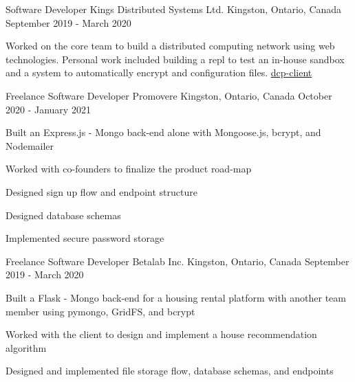 

\begin{cventries}

  \cventry
    {Software Developer} %
    {Kings Distributed Systems Ltd.} %
    {Kingston, Ontario, Canada} %
    {September 2019 - March 2020} %
    {
      \begin{cvitems} %
        \item {Worked on the core team to build a distributed computing network using web technologies. Personal work included building a repl to test an in-house sandbox and a system to automatically encrypt and configuration files. \href{https://www.npmjs.com/package/dcp-client}{dcp-client}}
      \end{cvitems}
    }

  \cventry
    {Freelance Software Developer} %
    {Promovere} %
    {Kingston, Ontario, Canada} %
    {October 2020 - January 2021} %
    {
      \begin{cvitems} %
        \item {Built an Express.js - Mongo back-end alone with Mongoose.js, bcrypt, and Nodemailer}
        \item{Worked with co-founders to finalize the product road-map}
        \item{Designed sign up flow and endpoint structure}
        \item{Designed database schemas}
        \item{Implemented secure password storage}
      \end{cvitems}
    }

  \cventry
    {Freelance Software Developer} %
    {Betalab Inc.} %
    {Kingston, Ontario, Canada} %
    {September 2019 - March 2020} %
    {
      \begin{cvitems} %
        \item {Built a Flask - Mongo back-end for a housing rental platform with another team member using pymongo, GridFS, and bcrypt}
        \item{Worked with the client to design and implement a house recommendation algorithm}
        \item{Designed and implemented file storage flow, database schemas, and endpoints}
      \end{cvitems}
    }


\end{cventries}
